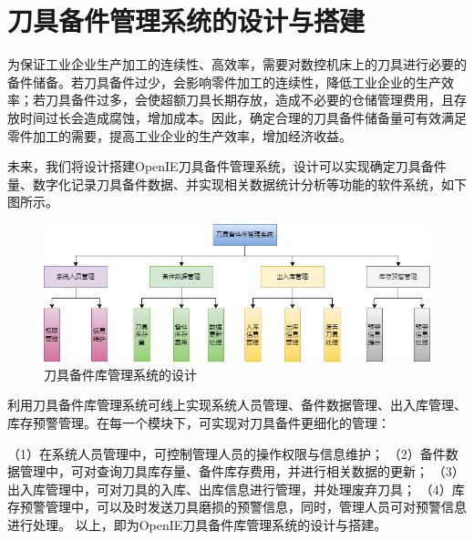 \section{刀具备件管理系统的设计与搭建}
为保证工业企业生产加工的连续性、高效率，需要对数控机床上的刀具进行必要的备件储备。若刀具备件过少，会影响零件加工的连续性，降低工业企业的生产效率；若刀具备件过多，会使超额刀具长期存放，造成不必要的仓储管理费用，且存放时间过长会造成腐蚀，增加成本。因此，确定合理的刀具备件储备量可有效满足零件加工的需要，提高工业企业的生产效率，增加经济收益。\par
未来，我们将设计搭建OpenIE刀具备件管理系统，设计可以实现确定刀具备件量、数字化记录刀具备件数据、并实现相关数据统计分析等功能的软件系统，如下图所示。\par
\begin{figure}[htp]
    \centering
    \includegraphics[width=12cm]{Chapter5/刀具备件库管理系统的设计.png}
    \caption{刀具备件库管理系统的设计}
\end{figure}
利用刀具备件库管理系统可线上实现系统人员管理、备件数据管理、出入库管理、库存预警管理。在每一个模块下，可实现对刀具备件更细化的管理：\par
（1）在系统人员管理中，可控制管理人员的操作权限与信息维护；
（2）备件数据管理中，可对查询刀具库存量、备件库存费用，并进行相关数据的更新；
（3）出入库管理中，可对刀具的入库、出库信息进行管理，并处理废弃刀具；
（4）库存预警管理中，可以及时发送刀具磨损的预警信息，同时，管理人员可对预警信息进行处理。
以上，即为OpenIE刀具备件库管理系统的设计与搭建。
% 
\newpage
